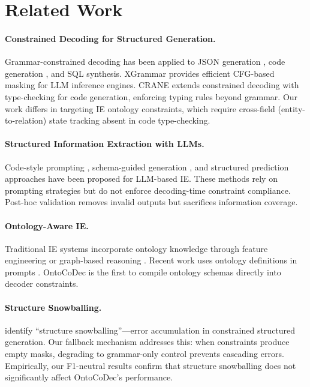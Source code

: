\documentclass[11pt]{article}
\begin{document}
\section{Related Work}

\paragraph{Constrained Decoding for Structured Generation.}
Grammar-constrained decoding has been applied to JSON generation \cite{willard2023efficient,dong2024xgrammar}, code generation \cite{scholak2021picard,poesia2022synchromesh}, and SQL synthesis.
XGrammar \cite{dong2024xgrammar} provides efficient CFG-based masking for LLM inference engines.
CRANE \cite{li2024crane} extends constrained decoding with type-checking for code generation, enforcing typing rules beyond grammar.
Our work differs in targeting IE ontology constraints, which require cross-field (entity-to-relation) state tracking absent in code type-checking.

\paragraph{Structured Information Extraction with LLMs.}
Code-style prompting \cite{li2023codeie}, schema-guided generation \cite{sainz2024gollie}, and structured prediction approaches have been proposed for LLM-based IE.
These methods rely on prompting strategies but do not enforce decoding-time constraint compliance.
Post-hoc validation removes invalid outputs but sacrifices information coverage.

\paragraph{Ontology-Aware IE.}
Traditional IE systems incorporate ontology knowledge through feature engineering or graph-based reasoning \cite{li2013joint,wadden2019entity}.
Recent work uses ontology definitions in prompts \cite{xu2023large,wadhwa2023revisiting}.
OntoCoDec is the first to compile ontology schemas directly into decoder constraints.

\paragraph{Structure Snowballing.}
\citet{zhang2024structure} identify ``structure snowballing''---error accumulation in constrained structured generation.
Our fallback mechanism addresses this: when constraints produce empty masks, degrading to grammar-only control prevents cascading errors.
Empirically, our F1-neutral results confirm that structure snowballing does not significantly affect OntoCoDec's performance.
\end{document}
